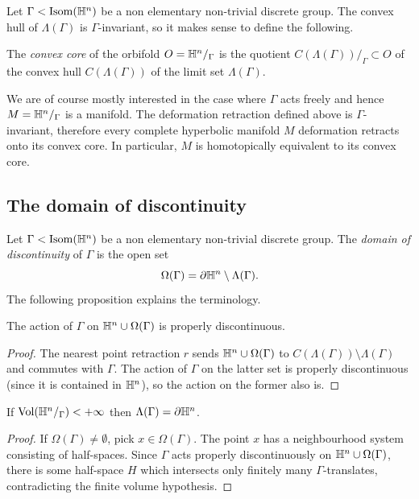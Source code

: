Let $\Gamma < {\rm Isom}(\mathbb{H}^n)$ be a non elementary non-trivial discrete group. The convex hull of $\Lambda(\Gamma)$ is $\Gamma$-invariant, so it makes sense to define the following. 

\begin{defn} The \emph{convex core} of the orbifold $O=\mathbb{H}^n/_\Gamma$ is the quotient $C(\Lambda(\Gamma))/_\Gamma \subset O$ of the convex hull $C(\Lambda(\Gamma))$ of the limit set $\Lambda(\Gamma)$.
\end{defn}

We are of course mostly interested in the case where $\Gamma$ acts freely and hence $M=\mathbb{H}^n/_\Gamma$ is a manifold.
The deformation retraction defined above is $\Gamma$-invariant, therefore every complete hyperbolic manifold $M$ deformation retracts onto its convex core. In particular, $M$ is homotopically equivalent to its convex core.

\subsection{The domain of discontinuity}
Let $\Gamma < {\rm Isom}(\mathbb{H}^n)$ be a non elementary non-trivial discrete group. The \emph{domain of discontinuity} of $\Gamma$ is the open set\index{$\Omega(\Gamma)$}
$$\Omega(\Gamma) = \partial\mathbb{H}^n \setminus \Lambda(\Gamma).$$
The following proposition explains the terminology.
\begin{prop}
The action of $\Gamma$ on $\mathbb{H}^n \cup \Omega(\Gamma)$ is properly discontinuous.
\end{prop}
\begin{proof}
The nearest point retraction $r$ sends $\mathbb{H}^n \cup \Omega(\Gamma)$ to $C(\Lambda(\Gamma)) \setminus \Lambda(\Gamma)$ and commutes with $\Gamma$. The action of $\Gamma$ on the latter set is properly discontinuous (since it is contained in $\mathbb{H}^n$), so the action on the former also is.
\end{proof}

\begin{prop}
If ${\rm Vol}(\mathbb{H}^n/_\Gamma)<+ \infty $ then $\Lambda(\Gamma) = \partial \mathbb{H}^n$.
\end{prop}
\begin{proof}
If $\Omega(\Gamma)\neq \emptyset$, pick $x\in \Omega(\Gamma)$. The point $x$ has a neighbourhood system consisting of half-spaces. Since $\Gamma$ acts properly discontinuously on $\mathbb{H}^n \cup \Omega(\Gamma)$, there is some half-space $H$ which intersects only finitely many $\Gamma$-translates, contradicting the finite volume hypothesis.
\end{proof}

